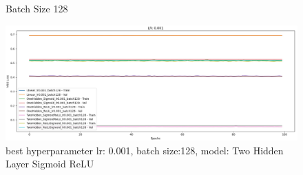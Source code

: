 \begin{figure}[!h]
\begin{minipage}{0.32\linewidth}
        \caption{Batch Size 128}
    \end{minipage}
\end{figure}

\begin{figure}[!h]
    \centering\includegraphics[width=1\linewidth]{crossentropy_best.jpg}
    \caption[short]{best hyperparameter lr: 0.001, batch size:128, model: Two Hidden Layer Sigmoid ReLU}
\end{figure}

